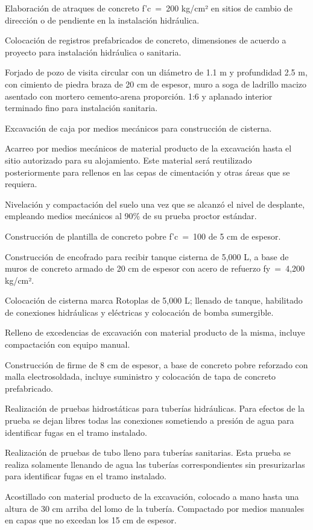 \documentclass{article}
\begin{document}
Elaboración de atraques de concreto f'c~=~200 kg/cm² en sitios de cambio de dirección o de pendiente en la instalación hidráulica.

Colocación de registros prefabricados de concreto, dimensiones de acuerdo a proyecto para instalación hidráulica o sanitaria.

Forjado de pozo de visita circular con un diámetro de 1.1 m y profundidad 2.5 m, con cimiento de piedra braza de 20 cm de espesor, muro a soga de ladrillo macizo asentado con mortero cemento-arena proporción. 1:6 y aplanado interior terminado fino para instalación sanitaria.

Excavación de caja por medios mecánicos para construcción de cisterna.

Acarreo por medios mecánicos de material producto de la excavación hasta el sitio autorizado para su alojamiento. Este material será reutilizado posteriormente para rellenos en las cepas de cimentación y otras áreas que se requiera.

Nivelación y compactación del suelo una vez que se alcanzó el nivel de desplante, empleando medios mecánicos al 90\% de su prueba proctor estándar.

Construcción de plantilla de concreto pobre f'c~=~100 de 5 cm de espesor.

Construcción de encofrado para recibir tanque cisterna de 5,000 L, a base de muros de concreto armado de 20 cm de espesor con acero de refuerzo fy~=~4,200 kg/cm².

Colocación de cisterna marca Rotoplas de 5,000 L; llenado de tanque, habilitado de conexiones hidráulicas y eléctricas y colocación de bomba sumergible.

Relleno de excedencias de excavación con material producto de la misma, incluye compactación con equipo manual.

Construcción de firme de 8 cm de espesor, a base de concreto pobre reforzado con malla electrosoldada, incluye suministro y colocación de tapa de concreto prefabricado.

Realización de pruebas hidrostáticas para tuberías hidráulicas. Para efectos de la prueba se dejan libres todas las conexiones sometiendo a presión de agua para identificar fugas en el tramo instalado.

Realización de pruebas de tubo lleno para tuberías sanitarias. Esta prueba se realiza solamente llenando de agua las tuberías correspondientes sin presurizarlas para identificar fugas en el tramo instalado.

Acostillado con material producto de la excavación, colocado a mano hasta una altura de 30 cm arriba del lomo de la tubería. Compactado por medios manuales en capas que no excedan los 15 cm de espesor.
\end{document}
